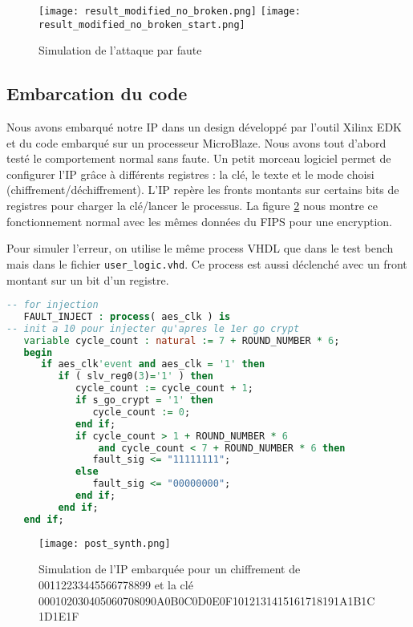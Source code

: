\begin{figure}[!h]
	\begin{center}
	\texttt{[image: result\_modified\_no\_broken.png]}
	\texttt{[image: result\_modified\_no\_broken\_start.png]}
	\caption{Simulation de l'attaque par faute}
	\label{modified_start}
	\label{modified}
	\end{center}
\end{figure}

\begin{minipage}{\textwidth}
\subsection{Embarcation du code}

Nous avons embarqué notre IP dans un design développé par l'outil Xilinx EDK
et du code embarqué sur un processeur MicroBlaze. Nous avons tout d'abord testé
le comportement normal sans faute. Un petit morceau logiciel permet de configurer
l'IP grâce à différents registres : la clé, le texte et le mode
choisi (chiffrement/déchiffrement). L'IP repère les fronts montants sur certains
bits de registres pour charger la clé/lancer le processus. La figure \ref{post}
nous montre ce fonctionnement normal avec les mêmes données du FIPS pour une encryption.

Pour simuler l'erreur, on utilise le même process VHDL que dans le test bench
mais dans le fichier \texttt{user\_logic.vhd}. Ce process est aussi déclenché
avec un front montant sur un bit d'un registre. 

\begin{lstlisting}[language=VHDL]
-- for injection
   FAULT_INJECT : process( aes_clk ) is
-- init a 10 pour injecter qu'apres le 1er go crypt
   variable cycle_count : natural := 7 + ROUND_NUMBER * 6;
   begin 
      if aes_clk'event and aes_clk = '1' then
         if ( slv_reg0(3)='1' ) then
            cycle_count := cycle_count + 1;
            if s_go_crypt = '1' then
               cycle_count := 0;
            end if;
            if cycle_count > 1 + ROUND_NUMBER * 6 
            	and cycle_count < 7 + ROUND_NUMBER * 6 then
               fault_sig <= "11111111";
            else 
               fault_sig <= "00000000";
            end if;
         end if;
   end if;
\end{lstlisting}

\end{minipage}

\begin{figure}[h!]
	\begin{center}
	\texttt{[image: post\_synth.png]}
	\caption{Simulation de l'IP embarquée pour un chiffrement de 
		00112233445566778899 et la clé 
		000102030405060708090A0B0C0D0E0F1012131415161718191A1B1C1D1E1F}
	\label{post}
	\end{center}
\end{figure}

